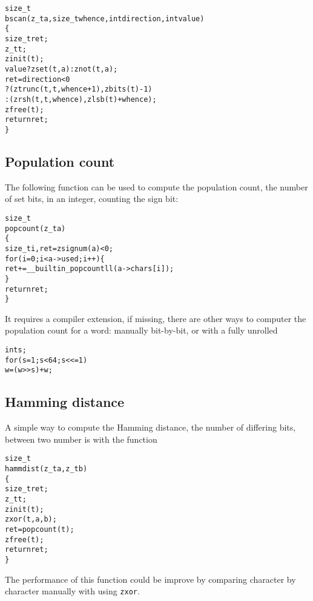 \begin{alltt}
   size_t
   bscan(z_t a, size_t whence, int direction, int value)
   \{
       size_t ret;
       z_t t;
       zinit(t);
       value ? zset(t, a) : znot(t, a);
       ret = direction < 0
           ? (ztrunc(t, t, whence + 1), zbits(t) - 1)
           : (zrsh(t, t, whence), zlsb(t) + whence);
       zfree(t);
       return ret;
   \}
\end{alltt}


\subsection{Population count}
\label{sec:Population count}

The following function can be used to compute
the population count, the number of set bits,
in an integer, counting the sign bit:

\begin{alltt}
   size_t
   popcount(z_t a)
   \{
       size_t i, ret = zsignum(a) < 0;
       for (i = 0; i < a->used; i++) \{
           ret += __builtin_popcountll(a->chars[i]);
       \}
       return ret;
   \}
\end{alltt}

\noindent
It requires a compiler extension, if missing,
there are other ways to computer the population
count for a word: manually bit-by-bit, or with
a fully unrolled

\begin{alltt}
   int s;
   for (s = 1; s < 64; s <<= 1)
       w = (w >> s) + w;
\end{alltt}


\subsection{Hamming distance}
\label{sec:Hamming distance}

A simple way to compute the Hamming distance,
the number of differing bits, between two number
is with the function

\begin{alltt}
   size_t
   hammdist(z_t a, z_t b)
   \{
       size_t ret;
       z_t t;
       zinit(t);
       zxor(t, a, b);
       ret = popcount(t);
       zfree(t);
       return ret;
   \}
\end{alltt}

\noindent
The performance of this function could
be improve by comparing character by
character manually with using {\tt zxor}.


